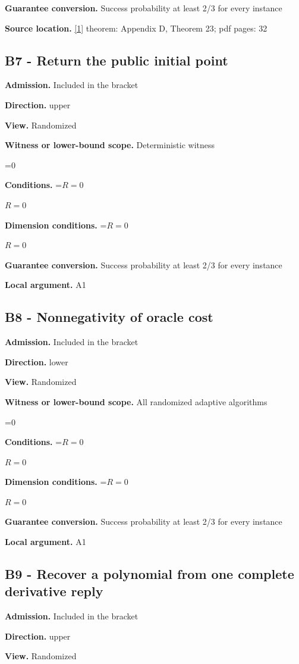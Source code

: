 \documentclass[10pt,a4paper]{article}
\newcommand{\AtlasMath}[1]{\par\begingroup\centering\setbox0=\hbox{$\displaystyle #1$}\ifdim\wd0>1.4\linewidth\typeout{ATLAS WIDE FORMULA: \the\wd0}\fi\ifdim\wd0>\linewidth\resizebox{\linewidth}{!}{\box0}\else\box0\fi\par\endgroup}
\newcommand{\AtlasInlineMath}[1]{\begingroup\setbox0=\hbox{$#1$}\ifdim\wd0>.4\linewidth\endgroup\AtlasMath{#1}\else\endgroup$#1$\fi}
\begin{document}
\textbf{Guarantee conversion.} Success probability at least 2/3 for every instance

\textbf{Source location.} \href{https://arxiv.org/pdf/2411.08987v2}{[1]} theorem: Appendix D, Theorem 23; pdf pages: 32

\subsection{B7 - Return the public initial point}
\textbf{Admission.} Included in the bracket

\textbf{Direction.} upper

\textbf{View.} Randomized

\textbf{Witness or lower-bound scope.} Deterministic witness

\AtlasMath{0}
\textbf{Conditions.} \AtlasInlineMath{R=0}

\textbf{Dimension conditions.} \AtlasInlineMath{R=0}

\textbf{Guarantee conversion.} Success probability at least 2/3 for every instance

\textbf{Local argument.} A1

\subsection{B8 - Nonnegativity of oracle cost}
\textbf{Admission.} Included in the bracket

\textbf{Direction.} lower

\textbf{View.} Randomized

\textbf{Witness or lower-bound scope.} All randomized adaptive algorithms

\AtlasMath{0}
\textbf{Conditions.} \AtlasInlineMath{R=0}

\textbf{Dimension conditions.} \AtlasInlineMath{R=0}

\textbf{Guarantee conversion.} Success probability at least 2/3 for every instance

\textbf{Local argument.} A1

\subsection{B9 - Recover a polynomial from one complete derivative reply}
\textbf{Admission.} Included in the bracket

\textbf{Direction.} upper

\textbf{View.} Randomized
\end{document}
